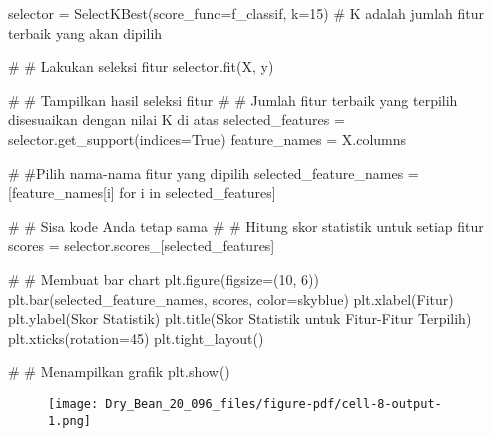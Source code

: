 \documentclass[
  letterpaper,
]{krantz}
\makeatletter
\newenvironment{Shaded}{\begin{snugshade}}{\end{snugshade}}
\newcommand{\CommentTok}[1]{\textcolor[rgb]{0.37,0.37,0.37}{#1}}
\newcommand{\ControlFlowTok}[1]{\textcolor[rgb]{0.00,0.23,0.31}{#1}}
\newcommand{\DecValTok}[1]{\textcolor[rgb]{0.68,0.00,0.00}{#1}}
\newcommand{\KeywordTok}[1]{\textcolor[rgb]{0.00,0.23,0.31}{#1}}
\newcommand{\NormalTok}[1]{\textcolor[rgb]{0.00,0.23,0.31}{#1}}
\newcommand{\OperatorTok}[1]{\textcolor[rgb]{0.37,0.37,0.37}{#1}}
\newcommand{\StringTok}[1]{\textcolor[rgb]{0.13,0.47,0.30}{#1}}
\newcommand{\VariableTok}[1]{\textcolor[rgb]{0.07,0.07,0.07}{#1}}
\newenvironment{kframe}{%
\medskip{}
\setlength{\fboxsep}{.8em}
 \def\at@end@of@kframe{}%
 \ifinner\ifhmode%
  \def\at@end@of@kframe{\end{minipage}}%
  \begin{minipage}{\columnwidth}%
 \fi\fi%
 \def\FrameCommand##1{\hskip\@totalleftmargin \hskip-\fboxsep
 \colorbox{shadecolor}{##1}\hskip-\fboxsep
     \hskip-\linewidth \hskip-\@totalleftmargin \hskip\columnwidth}%
 \MakeFramed {\advance\hsize-\width
   \@totalleftmargin\z@ \linewidth\hsize
   \@setminipage}}%
 {\par\unskip\endMakeFramed%
 \at@end@of@kframe}
\renewenvironment{Shaded}{\begin{kframe}}{\end{kframe}}
\makeatother
\begin{document}
\begin{Shaded}
\begin{Highlighting}[]

\NormalTok{selector }\OperatorTok{=}\NormalTok{ SelectKBest(score\_func}\OperatorTok{=}\NormalTok{f\_classif, k}\OperatorTok{=}\DecValTok{15}\NormalTok{)  }\CommentTok{\# K adalah jumlah fitur terbaik yang akan dipilih}

\CommentTok{\# \# Lakukan seleksi fitur}
\NormalTok{selector.fit(X, y)}

\CommentTok{\# \# Tampilkan hasil seleksi fitur}
\CommentTok{\# \# Jumlah fitur terbaik yang terpilih disesuaikan dengan nilai K di atas}
\NormalTok{selected\_features }\OperatorTok{=}\NormalTok{ selector.get\_support(indices}\OperatorTok{=}\VariableTok{True}\NormalTok{)}
\NormalTok{feature\_names }\OperatorTok{=}\NormalTok{ X.columns}

\CommentTok{\# \#Pilih nama{-}nama fitur yang dipilih}
\NormalTok{selected\_feature\_names }\OperatorTok{=}\NormalTok{ [feature\_names[i] }\ControlFlowTok{for}\NormalTok{ i }\KeywordTok{in}\NormalTok{ selected\_features]}

\CommentTok{\# \# Sisa kode Anda tetap sama}
\CommentTok{\# \# Hitung skor statistik untuk setiap fitur}
\NormalTok{scores }\OperatorTok{=}\NormalTok{ selector.scores\_[selected\_features]}


\CommentTok{\# \# Membuat bar chart}
\NormalTok{plt.figure(figsize}\OperatorTok{=}\NormalTok{(}\DecValTok{10}\NormalTok{, }\DecValTok{6}\NormalTok{))}
\NormalTok{plt.bar(selected\_feature\_names, scores, color}\OperatorTok{=}\StringTok{\textquotesingle{}skyblue\textquotesingle{}}\NormalTok{)}
\NormalTok{plt.xlabel(}\StringTok{\textquotesingle{}Fitur\textquotesingle{}}\NormalTok{)}
\NormalTok{plt.ylabel(}\StringTok{\textquotesingle{}Skor Statistik\textquotesingle{}}\NormalTok{)}
\NormalTok{plt.title(}\StringTok{\textquotesingle{}Skor Statistik untuk Fitur{-}Fitur Terpilih\textquotesingle{}}\NormalTok{)}
\NormalTok{plt.xticks(rotation}\OperatorTok{=}\DecValTok{45}\NormalTok{)}
\NormalTok{plt.tight\_layout()}

\CommentTok{\# \# Menampilkan grafik}
\NormalTok{plt.show()}
\end{Highlighting}
\end{Shaded}

\begin{figure}[H]

{\centering \texttt{[image: Dry\_Bean\_20\_096\_files/figure-pdf/cell-8-output-1.png]}

}

\end{figure}
\end{document}
